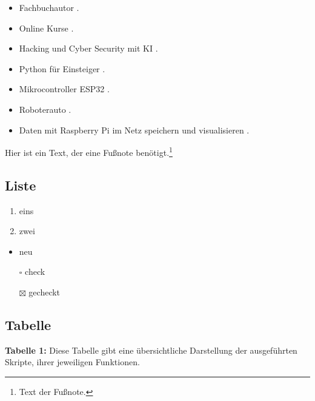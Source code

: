 \documentclass{vorlage-design-main}
\begin{document}
\begin{itemize}

\item
  Fachbuchautor \textcite{dalwigk:2024:fachbuchautor}.
\item
  Online Kurse \textcite{schaffranek:2024:kurse}.
\item
  Hacking und Cyber Security mit KI \textcite{dalwigk:2023:hacking}.
\item
  Python für Einsteiger \textcite{dalwigk:2022:python}.
\item
  Mikrocontroller ESP32 \textcite{brandes:2023:mikrocontroller}.
\item
  Roboterauto \textcite{brandes:2022:esp32}.
\item
  Daten mit Raspberry Pi im Netz speichern und visualisieren
  \textcite{brandes:2023:daten}.
\end{itemize}

Hier ist ein Text, der eine Fußnote benötigt.\footnote{Text der Fußnote.}

\subsection{Liste}\label{liste}

\begin{enumerate}
\def\labelenumi{\arabic{enumi}.}

\item
  eins
\item
  zwei
\end{enumerate}

\begin{itemize}

\item
  neu
\item[$\square$]
  check
\item[$\boxtimes$]
  gecheckt
\end{itemize}

\subsection{Tabelle}\label{tabelle}

\textbf{Tabelle 1:} Diese Tabelle gibt eine übersichtliche Darstellung
der ausgeführten Skripte, ihrer jeweiligen Funktionen.
\end{document}
